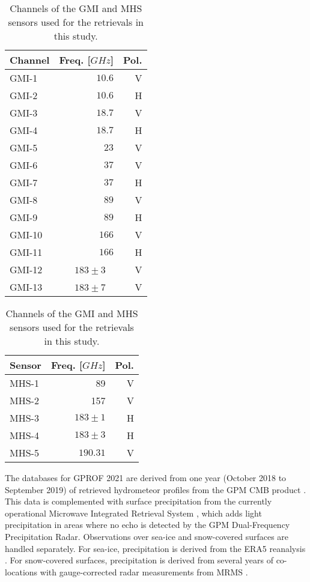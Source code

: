 \documentclass[journal abbreviation, manuscript]{copernicus}
\begin{document}
\begin{table}[hbpt]
  \caption{Channels of the GMI and MHS sensors used for the retrievals in this study.}
  \label{tab:channels}
  \begin{tabular}{lrr}
    Channel & Freq. [$\unit{GHz}$] & Pol. \\
    \hline
   GMI-1  & $10.6$ & V  \\
   GMI-2  & $10.6$ & H  \\
   GMI-3  & $18.7$ & V  \\
   GMI-4  & $18.7$ & H  \\
   GMI-5  & $23$   & V  \\
   GMI-6  & $37$   & V  \\
   GMI-7  & $37$   & H  \\
   GMI-8  & $89$   & V  \\
   GMI-9  & $89$   & H  \\
   GMI-10 & $166$ & V \\
   GMI-11 & $166$ & H  \\
   GMI-12 & $183 \pm 3$ \ & V \\
   GMI-13 & $183 \pm 7$ \ & V \\
  \end{tabular}%
  \hspace{1cm}
    \begin{tabular}{lrr}
      Sensor & Freq. [$\unit{GHz}$] & Pol. \\
      \hline
      MHS-1 &  89 & V \\
      MHS-2 &  157 & V \\
      MHS-3 &  $183 \pm 1$ & H \\
      MHS-4 &  $183 \pm 3$ & H \\
      MHS-5 &  $190.31$ & V \\
    \end{tabular}
\end{table}





The databases for GPROF 2021 are derived from one year (October 2018 to
September 2019) of retrieved hydrometeor profiles from the GPM CMB product
\citep{grecu16}. This data is complemented with surface precipitation from the
currently operational Microwave Integrated Retrieval System \citep{boukabara11},
which adds light precipitation in areas where no echo is detected by the GPM
Dual-Frequency Precipitation Radar. Observations over sea-ice and snow-covered
surfaces are handled separately. For sea-ice, precipitation is derived from the
ERA5 reanalysis \citep{hersbach20}. For snow-covered surfaces, precipitation is
derived from several years of co-locations with gauge-corrected radar measurements
from MRMS \citep{smith16}.
\end{document}
